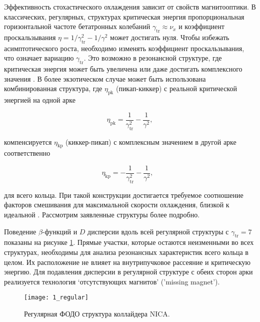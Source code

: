 \noindent Эффективность стохастического охлаждения зависит от свойств магнитооптики. В классических, регулярных, структурах критическая энергия пропорциональная горизонтальной частоте бетатронных колебаний $\gamma_{\text{tr}}\approx\nu_x$ и коэффициент проскальзывания $\eta=1/\gamma_{\textrm{tr}}^2-1/\gamma^2$ может достигать нуля. Чтобы избежать асимптотического роста, необходимо изменять коэффициент проскальзывания, что означает вариацию $\gamma_{\textrm{tr}}$. Это возможно в резонансной структуре, где критическая энергия может быть увеличена или даже достигать комплексного значения \cite{senichev:resonant}. В более экзотическом случае может быть использована комбинированная структура, где $\eta_{\textrm{pk}}$ (пикап-киккер) с реальной критической энергией на одной арке

\begin{equation} \label{eq:eta_pk}
\eta_{\textrm{pk}}=\frac{1}{\gamma_{\textrm{tr}}^2}-\frac{1}{\gamma^2},
\end{equation}

\noindent компенсируется $\eta_{\textrm{kp}}$ (киккер-пикап) с комплексным значением в другой арке соответственно

\begin{equation} \label{eq:eta_kp}
\eta_{\textrm{kp}}=-\frac{1}{\gamma_{\textrm{tr}}^2}-\frac{1}{\gamma^2},\ \ \ 
\end{equation}

\noindent для всего кольца. При такой конструкции достигается требуемое соотношение факторов смешивания для максимальной скорости охлаждения, близкой к идеальной \cite{senichev:hesr}. Рассмотрим заявленные структуры более подробно.

\par Поведение $\beta$-функций и $D$ дисперсии вдоль всей регулярной структуры с $\gamma_{\text{tr}}=7$ показаны на рисунке \ref{fig:1_regular}. Прямые участки, которые остаются неизменными во всех структурах, необходимы для анализа резонансных характеристик всего кольца в целом. Их расположение не влияет на внутрипучковое рассеяние и критическую энергию. Для подавления дисперсии в регулярной структуре с обеих сторон арки реализуется технология ‘отсутствующих магнитов’ ('missing magnet').

\begin{figure}[!h]
  \centering
   \texttt{[image: 1\_regular]}
   \caption{Регулярная ФОДО структура коллайдера NICA.}
   \label{fig:1_regular}
\end{figure}

